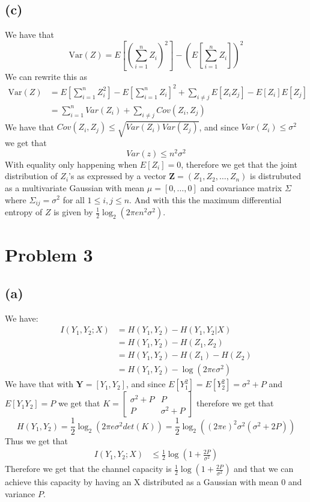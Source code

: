 \subsection*{(c)}
We have that 
$$\text{Var}(Z)=E[(\sum_{i=1}^{n}Z_i)^2]-(E[\sum_{i=1}^{n}Z_i])^2$$
We can rewrite this as 
\begin{align*}
    \text{Var}(Z)&=E[\sum_{i=1}^{n}Z_i^2]-E[\sum_{i=1}^{n}Z_i]^2+\sum_{i\neq j}E[Z_iZ_j]-E[Z_i]E[Z_j]\\
    &=\sum_{i=1}^{n}Var(Z_i)+\sum_{i\neq j}Cov(Z_i,Z_j)
\end{align*}
We have that $Cov(Z_i,Z_j)\leq \sqrt{Var(Z_i)Var(Z_j)}$, and since 
$Var(Z_i)\leq \sigma^2$ we get that
$$Var(z)\leq n^2\sigma^2$$
With equality only happening when $E[Z_i]=0$, therefore we get that 
the joint distribution of $Z_i$'s as expressed by a vector  
$\mathbf{Z}=(Z_1,Z_2,\ldots,Z_n)$ is distrubuted as a multivariate Gaussian with mean $\mu=[0,\ldots,0]$ and covariance matrix
$\Sigma$ where $\Sigma_{ij}=\sigma^2$ for all $1\leq i,j\leq n$. And with this the 
maximum differential entropy of $Z$ is given by $\boxed{\frac{1}{2}\log_2(2\pi e n^2\sigma^2)}$.
\section*{Problem 3}
\subsection*{(a)}
We have:
\begin{align*}
    I(Y_1,Y_2;X)&=H(Y_1,Y_2)-H(Y_1,Y_2|X)\\
    &=H(Y_1,Y_2)-H(Z_1,Z_2)\\
    &=H(Y_1,Y_2)-H(Z_1)-H(Z_2)\\
    &=H(Y_1,Y_2)-\log(2\pi e\sigma^2)
\end{align*}
We have that with $\textbf{Y}=[Y_1,Y_2]$, and since 
$E[Y_1^2]=E[Y_2^2]=\sigma^2+P$ and $E[Y_1Y_2]=P$ we get that
$K=\begin{bmatrix}
    \sigma^2+P & P\\
    P & \sigma^2+P
\end{bmatrix}$ therefore we get
that 
$$H(Y_1,Y_2)=\frac{1}{2}\log_2(2\pi e\sigma^2 det(K))=\frac{1}{2}\log_2((2\pi e)^2\sigma^2(\sigma^2+2P))$$
Thus we get that 
\begin{align*}
    I(Y_1,Y_2;X)&\leq \frac{1}{2}\log\left(1+\frac{2P}{\sigma^2}\right)
\end{align*}
Therefore we get that the channel capacity is $\boxed{\frac{1}{2}\log\left(1+\frac{2P}{\sigma^2}\right)}$
and that we can achieve this capacity by having an X distributed as a Gaussian with mean 0 and variance $P$.
